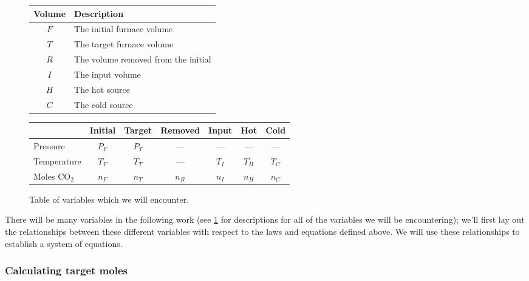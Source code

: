 \documentclass{article}
\newcommand{\CDiox}{\mathrm{CO}_2}
\begin{document}
\begin{figure}
    \begin{center}
        \begin{tabular}{cl}
            \toprule
            Volume & Description \\
            \midrule
            $F$   & The initial furnace volume \\
            $T$   & The target furnace volume \\
            $R$   & The volume removed from the initial \\
            $I$   & The input volume \\
            $H$   & The hot source \\
            $C$   & The cold source \\
            \bottomrule
        \end{tabular}
        \vspace{1em}

        \begin{tabular}{l*6c}
            \toprule
                           & Initial & Target & Removed & Input & Hot   & Cold  \\
            \midrule                                           
            Pressure       & $P_F$   & $P_T$  & ---     & ---   & ---   & ---   \\
            Temperature    & $T_F$   & $T_T$  & ---     & $T_I$ & $T_H$ & $T_C$ \\
            Moles $\CDiox$ & $n_F$   & $n_T$  & $n_R$   & $n_I$ & $n_H$ & $n_C$ \\
            \bottomrule
        \end{tabular}
    \end{center}
    \caption{Table of variables which we will encounter.}
    \label{fig:var-table}
\end{figure}

There will be many variables in the following work (see \cref{fig:var-table} for descriptions for
all of the variables we will be encountering); we'll first lay out the relationships between
these different variables with respect to the laws and equations defined above. We will use these
relationships to establish a system of equations.

\subsubsection*{Calculating target moles}
\end{document}
